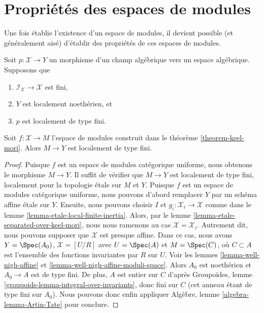 \section{Propriétés des espaces de modules}
\label{section-properties-moduli-spaces}

\noindent
Une fois établie l'existence d'un espace de modules,
il devient possible (et généralement aisé) d'établir
des propriétés de ces espaces de modules.

\begin{lemma}
\label{lemma-keel-mori-finite-type}
Soit $p : \mathcal{X} \to Y$ un morphisme d'un champ algébrique vers un
espace algébrique. Supposons que
\begin{enumerate}
\item $\mathcal{I}_\mathcal{X} \to \mathcal{X}$ est fini,
\item $Y$ est localement noethérien, et
\item $p$ est localement de type fini.
\end{enumerate}
Soit $f : \mathcal{X} \to M$ l'espace de modules construit dans le
théorème \ref{theorem-keel-mori}.
Alors $M \to Y$ est localement de type fini.
\end{lemma}

\begin{proof}
Puisque $f$ est un espace de modules catégorique uniforme, nous obtenons le
morphisme $M \to Y$. Il suffit de vérifier que $M \to Y$
est localement de type fini, localement pour la topologie \'etale sur $M$ et $Y$.
Puisque $f$ est un espace de modules catégorique uniforme, nous
pouvons d'abord remplacer $Y$ par un schéma affine \'etale sur $Y$.
Ensuite, nous pouvons choisir $I$ et $g_i : \mathcal{X}_i \to \mathcal{X}$
comme dans le lemme \ref{lemma-etale-local-finite-inertia}.
Alors, par le lemme \ref{lemma-etale-separated-over-keel-mori},
nous nous ramenons au cas $\mathcal{X} = \mathcal{X}_i$.
Autrement dit, nous pouvons supposer que $\mathcal{X}$ est presque affine.
Dans ce cas, nous avons $Y = \Spec(A_0)$,
$\mathcal{X} = [U/R]$ avec $U = \Spec(A)$ et
$M = \Spec(C)$, où $C \subset A$ est l'ensemble des fonctions invariantes par $R$
sur $U$. Voir les
lemmes \ref{lemma-well-nigh-affine} et
\ref{lemma-well-nigh-affine-moduli-space}.
Alors $A_0$ est noethérien et $A_0 \to A$ est de type fini.
De plus, $A$ est entier sur $C$ d'après
Groupoïdes, lemme \ref{groupoids-lemma-integral-over-invariants},
donc fini sur $C$
(cet anneau étant de type fini sur $A_0$).
Nous pouvons donc enfin appliquer
Algèbre, lemme \ref{algebra-lemma-Artin-Tate}
pour conclure.
\end{proof}

